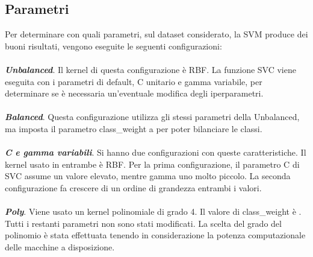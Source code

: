 \subsection{Parametri}
Per determinare con quali parametri, sul dataset considerato, la SVM produce dei buoni risultati, vengono eseguite le seguenti configurazioni:

\paragraph*{}
\textbf{\textit{Unbalanced}}. Il kernel di questa configurazione è RBF. La funzione SVC viene eseguita con i parametri di default, C unitario e gamma variabile, per determinare se è necessaria un'eventuale modifica degli iperparametri.

\paragraph*{}
\textbf{\textit{Balanced}}. Questa configurazione utilizza gli stessi parametri della Unbalanced, ma imposta il parametro class\_weight a  per poter bilanciare le classi.

\paragraph*{}
\textbf{\textit{C e gamma variabili}}. Si hanno due configurazioni con queste caratteristiche. Il kernel usato in entrambe è RBF. Per la prima configurazione, il parametro C di SVC assume un valore elevato, mentre gamma uno molto piccolo. La seconda configurazione fa crescere di un ordine di grandezza entrambi i valori.

\paragraph*{}
\textbf{\textit{Poly}}. Viene usato un kernel polinomiale di grado 4. Il valore di class\_weight è . Tutti i restanti parametri non sono stati modificati. La scelta del grado del polinomio è stata effettuata tenendo in considerazione la potenza computazionale delle macchine a disposizione.

